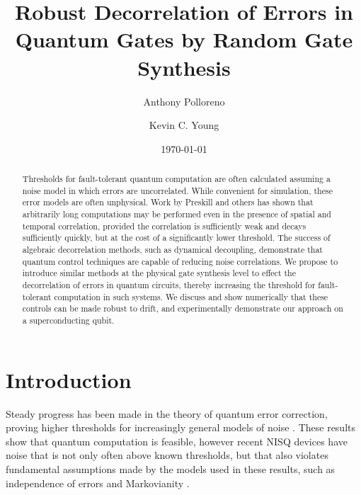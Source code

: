 \documentclass[aps,nofootinbib,pra,notitlepage,twocolumn]{revtex4-1}
\begin{document}
\title{Robust Decorrelation of Errors in Quantum Gates by Random Gate Synthesis}

\author{Anthony Polloreno}

\author{Kevin C. Young}

\date{\today}

\begin{abstract}
Thresholds for fault-tolerant quantum computation are often calculated assuming a noise model in which errors are uncorrelated. While convenient for simulation, these error models are often unphysical. Work by Preskill and others has shown that arbitrarily long computations may be performed even in the presence of spatial and temporal correlation, provided the correlation is sufficiently weak and decays sufficiently quickly, but at the cost of a significantly lower threshold. The success of algebraic decorrelation methods, such as dynamical decoupling, demonstrate that quantum control techniques are capable of reducing noise correlations. We propose to introduce similar methods at the physical gate synthesis level to effect the decorrelation of errors in quantum circuits, thereby increasing the threshold for fault-tolerant computation in such systems. We discuss and show numerically that these controls can be made robust to drift, and experimentally demonstrate our approach on a superconducting qubit.
\end{abstract}

\pacs{}

\maketitle

\section{Introduction}

Steady progress has been made in the theory of quantum error correction, proving higher thresholds for increasingly general models of noise \cite{Aharonov2006, 1609.00510, https://doi.org/10.7907/z96m34sc, Kubica2018, Wang2003, Campbell2017}. These results show that quantum computation is feasible, however recent NISQ \cite{Preskill2018} devices have noise that is not only often above known thresholds, but that also violates fundamental assumptions made by the models used in these results\cite{Kelly2018, BlumeKohout2017, Klimov2018}, such as independence of errors\cite{Knill1998} and Markovianity \cite{Kitaev1997}.
\end{document}
